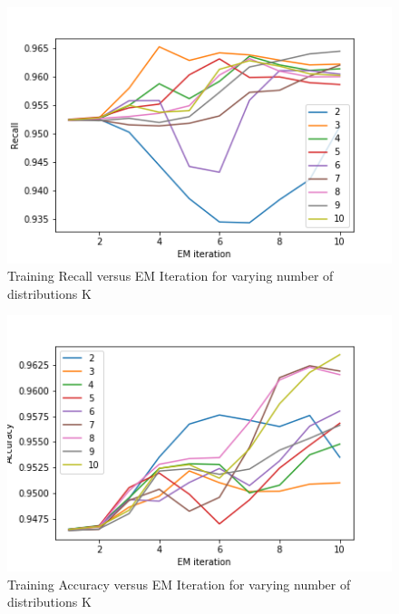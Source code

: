 \documentclass[11pt]{article}
\begin{document}
\begin{figure}[H]
	
	\includegraphics[width=\textwidth, keepaspectratio]{Recall.png}
	\caption{Training Recall versus EM Iteration for varying number of distributions K}
\end{figure}
\begin{figure}[H]
	
	\includegraphics[width=\textwidth, keepaspectratio]{Accuracy.png}
	\caption{Training Accuracy versus EM Iteration for varying number of distributions K}
\end{figure}
\end{document}
